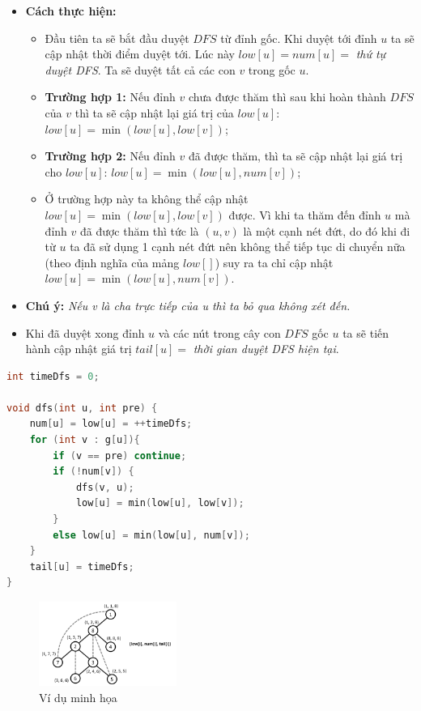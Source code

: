 \documentclass{article}
\begin{document}
\begin{itemize}
    \item \textbf{Cách thực hiện:}
    \begin{itemize}
        \item Đầu tiên ta sẽ bắt đầu duyệt $DFS$ từ đỉnh gốc. Khi duyệt tới đỉnh $u$ ta sẽ cập nhật thời điểm duyệt tới. Lúc này $low[u] = num[u] =$ \textit{thứ tự duyệt DFS}. Ta sẽ duyệt tất cả các con $v$ trong gốc $u$.
        \item \textbf{Trường hợp 1:} Nếu đỉnh $v$ chưa được thăm thì sau khi hoàn thành $DFS$ của $v$ thì ta sẽ cập nhật lại giá trị của $low[u]$: $low[u] = \min(low[u], low[v])$;
        \item \textbf{Trường hợp 2:} Nếu đỉnh $v$ đã được thăm, thì ta sẽ cập nhật lại giá trị cho $low[u]$: $low[u] = \min(low[u], num[v])$;
        \item Ở trường hợp này ta không thể cập nhật $low[u] = \min(low[u], low[v])$ được. Vì khi ta thăm đến đỉnh $u$ mà đỉnh $v$ đã được thăm thì tức là $(u, v)$ là một cạnh nét đứt, do đó khi đi từ $u$ ta đã sử dụng 1 cạnh nét đứt nên không thể tiếp tục di chuyển nữa (theo định nghĩa của mảng $low[]$) suy ra ta chỉ cập nhật $low[u] = \min(low[u], num[v])$.
    \end{itemize}
    \item \textbf{Chú ý:} \textit{Nếu v là cha trực tiếp của u thì ta bỏ qua không xét đến.}
    \item Khi đã duyệt xong đỉnh $u$ và các nút trong cây con $DFS$ gốc $u$ ta sẽ tiến hành cập nhật giá trị $tail[u] =$ \textit{thời gian duyệt DFS hiện tại}.
\end{itemize}

\begin{lstlisting}[language=C++, caption={Cài đặt}]
int timeDfs = 0; 

void dfs(int u, int pre) {
    num[u] = low[u] = ++timeDfs;
    for (int v : g[u]){
        if (v == pre) continue;
        if (!num[v]) {
            dfs(v, u);
            low[u] = min(low[u], low[v]);
        }
        else low[u] = min(low[u], num[v]);
    }
    tail[u] = timeDfs;
}
\end{lstlisting}

\begin{figure}[h]
    \centering
    \includegraphics[width=0.4\textwidth]{img/b3/Depth-First-Search-Tree_img3.png}  
    \caption{Ví dụ minh họa}  
\end{figure}
\end{document}
